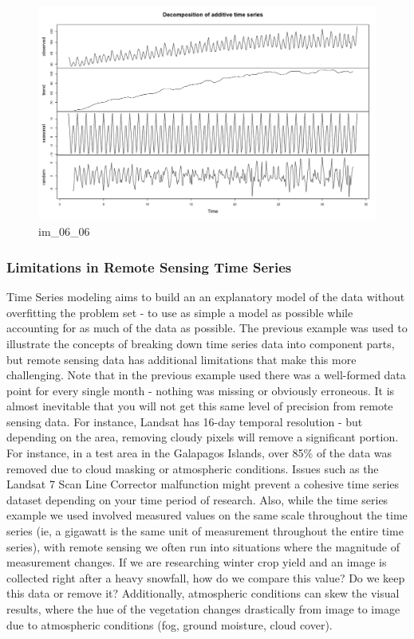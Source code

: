 \documentclass[
]{article}
\begin{document}
\begin{figure}
\centering
\includegraphics{./im/im_06_02.png}
\caption{im\_06\_06}
\end{figure}

\hypertarget{limitations-in-remote-sensing-time-series}{%
\subsubsection{Limitations in Remote Sensing Time Series}\label{limitations-in-remote-sensing-time-series}}

Time Series modeling aims to build an an explanatory model of the data without overfitting the problem set - to use as simple a model as possible while accounting for as much of the data as possible. The previous example was used to illustrate the concepts of breaking down time series data into component parts, but remote sensing data has additional limitations that make this more challenging. Note that in the previous example used there was a well-formed data point for every single month - nothing was missing or obviously erroneous. It is almost inevitable that you will not get this same level of precision from remote sensing data. For instance, Landsat has 16-day temporal resolution - but depending on the area, removing cloudy pixels will remove a significant portion. For instance, in a test area in the Galapagos Islands, over 85\% of the data was removed due to cloud masking or atmospheric conditions. Issues such as the Landsat 7 Scan Line Corrector malfunction might prevent a cohesive time series dataset depending on your time period of research. Also, while the time series example we used involved measured values on the same scale throughout the time series (ie, a gigawatt is the same unit of measurement throughout the entire time series), with remote sensing we often run into situations where the magnitude of measurement changes. If we are researching winter crop yield and an image is collected right after a heavy snowfall, how do we compare this value? Do we keep this data or remove it? Additionally, atmospheric conditions can skew the visual results, where the hue of the vegetation changes drastically from image to image due to atmospheric conditions (fog, ground moisture, cloud cover).
\end{document}
